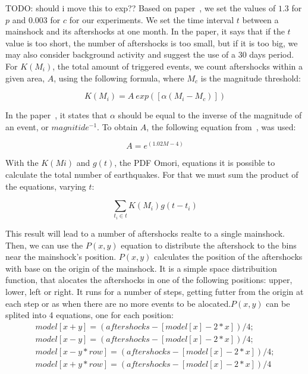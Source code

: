 TODO: should i move this to exp??
Based on paper~\cite{yamanaka1990scaling}, we set the values of $1.3$ for $p$ and $0.003$ for $c$ for our experiments. We set the time interval $t$ between a mainshock and its aftershocks at one month. In the paper, it says that if the $t$ value is too short, the number of aftershocks is too small, but if it is too big, we may also consider background activity and suggest the use of a 30 days period.\\

For $K(M_i)$, the total amount of triggered events, we count aftershocks within a given area, $A$, using the following formula, where $M_c$ is the magnitude threshold:

\begin{equation}\label{triggered}
 K(M_i) = A\ exp([\alpha(M_i-M_c)])
\end{equation}

In the paper~\cite{ogata2006space}, it states that $\alpha$ should be equal to the inverse of the magnitude of an event, or $magnitide^{-1}$. To obtain $A$, the following equation from~\cite{yamanaka1990scaling}, was used:

\begin{equation}
A = e^{(1.02M -4)}
\end{equation}

With the $K(Mi)$ and $g(t)$, the PDF Omori, equations it is possible to calculate the total number of earthquakes. For that we must sum the product of the equations, varying $t$:

\begin{equation}
\displaystyle\sum_{t_i \in t} K(M_i)g(t-t_i)
\end{equation}

This result will lead to a number of aftershocks realte to a single mainshock. Then, we can use the $P(x,y)$ equation to distribute the aftershock to the bins near the mainshock's position.  $P(x,y)$ calculates the position of the aftershocks with base on the origin of the mainshock. It is a simple space distribuition function, that alocates the aftershocks in one of the following positions: upper, lower, left or right. It runs for a number of steps, getting futter from the origin at each step or as when there are no more events to be alocated.$P(x,y)$ can be splited into 4 equations, one for each position:\\

\begin{subequations}
\begin{gather*}
        model[x+y] = (aftershocks-[model[x]-2*x])/4;\\
        model[x-y] = (aftershocks-[model[x]-2*x])/4;\\
        model[x-y*row] = (aftershocks-[model[x]-2*x])/4;\\
        model[x+y*row] = (aftershocks-[model[x]-2*x])/4
\end{gather*}
\end{subequations}


